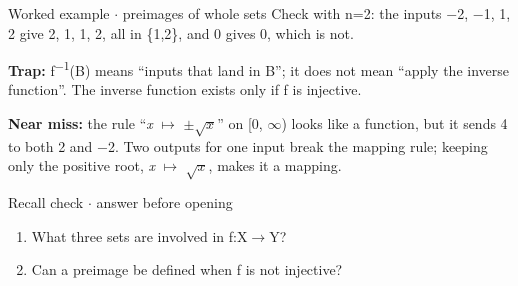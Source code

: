 \documentclass[11pt]{article}
\begin{document}
\begin{keepsection}
\begin{workedbox}{Worked example \ensuremath{\cdot} preimages of whole sets}
Check with n=2: the inputs \ensuremath{-}2, \ensuremath{-}1, 1, 2 give 2, 1, 1, 2, all in \{1,2\}, and 0 gives 0, which is not.
\end{workedbox}

\begin{notebox}\textbf{Trap:} f\textsuperscript{\ensuremath{-}1}(B) means “inputs that land in B”; it does not mean “apply the inverse function”. The inverse function exists only if f is injective.\end{notebox}

\begin{notebox}\textbf{Near miss:} the rule “\textit{x} \ensuremath{\mapsto} \ensuremath{\pm}\ensuremath{\sqrt{{x}}}” on [0, \ensuremath{\infty}) looks like a function, but it sends 4 to both 2 and \ensuremath{-}2. Two outputs for one input break the mapping rule; keeping only the positive root, \textit{x} \ensuremath{\mapsto} \ensuremath{\sqrt{{x}}}, makes it a mapping.\end{notebox}

\begin{recallbox}{Recall check \ensuremath{\cdot} answer before opening}
\begin{enumerate}
\item What three sets are involved in f:X\ensuremath{\to}Y?
\item Can a preimage be defined when f is not injective?
\end{enumerate}

\end{recallbox}
\end{keepsection}
\end{document}
